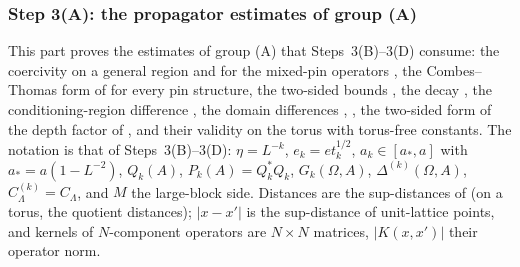 
\subsubsection*{Step 3(A): the propagator estimates of group (A)}

This part proves the estimates of group (A) that Steps~3(B)--3(D) consume: the coercivity \cite[(1.8)]{Ba4} on a general region and for the mixed-pin operators \cite[(3.5)]{Ba4}, the Combes--Thomas form of \cite[Cor.~2.3]{Ba4} for every pin structure, the two-sided bounds \cite[(1.15)]{Ba4}, the decay \cite[(1.16)]{Ba4}, the conditioning-region difference \cite[(1.18)]{Ba4}, the domain differences \cite[(5.5), (1.20)]{Ba4}, \cite[Prop.~2.2, (2.27)--(2.29)]{Ba1}, the two-sided form of the depth factor of \cite[Thm., (1.12)]{Ba4}, and their validity on the torus with torus-free constants. The notation is that of Steps~3(B)--3(D): $\eta=L^{-k}$, $e_k=et_k^{1/2}$, $a_k\in[a_*,a]$ with $a_*=a(1-L^{-2})$, $Q_k(A)$, $P_k(A)=Q_k^*Q_k$, $G_k(\Omega,A)$, $\Delta^{(k)}(\Omega,A)$, $C^{(k)}_\Lambda=C_\Lambda$, and $M$ the large-block side. Distances are the sup-distances of \cite[(1.3)]{Ba1} (on a torus, the quotient distances); $|x-x'|$ is the sup-distance of unit-lattice points, and kernels of $N$-component operators are $N\times N$ matrices, $|K(x,x')|$ their operator norm.

